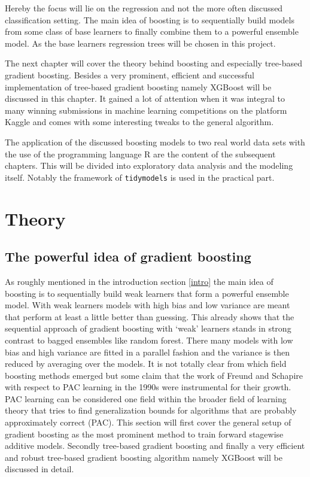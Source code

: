 \documentclass[
]{book}
\begin{document}
Hereby the focus will lie on the regression and not the more often discussed classification setting. The main idea of boosting is to sequentially build models from some class of base learners to finally combine them to a powerful ensemble model. As the base learners regression trees will be chosen in this project.

The next chapter will cover the theory behind boosting and especially tree-based gradient boosting. Besides a very prominent, efficient and successful implementation of tree-based gradient boosting namely XGBoost will be discussed in this chapter. It gained a lot of attention when it was integral to many winning submissions in machine learning competitions on the platform Kaggle and comes with some interesting tweaks to the general algorithm.

The application of the discussed boosting models to two real world data sets with the use of the programming language R are the content of the subsequent chapters. This will be divided into exploratory data analysis and the modeling itself. Notably the framework of \texttt{tidymodels} is used in the practical part.

\hypertarget{theory}{%
\chapter{Theory}\label{theory}}

\hypertarget{the-powerful-idea-of-gradient-boosting}{%
\section{The powerful idea of gradient boosting}\label{the-powerful-idea-of-gradient-boosting}}

As roughly mentioned in the introduction section \ref{intro} the main idea of boosting is to sequentially build weak learners that form a powerful ensemble model. With weak learners models with high bias and low variance are meant that perform at least a little better than guessing. This already shows that the sequential approach of gradient boosting with `weak' learners stands in strong contrast to bagged ensembles like random forest. There many models with low bias and high variance are fitted in a parallel fashion and the variance is then reduced by averaging over the models.\citep{HandsOnMLwithR} It is not totally clear from which field boosting methods emerged but some claim that the work of Freund and Schapire with respect to PAC learning in the 1990s were instrumental for their growth.\citep{elements} PAC learning can be considered one field within the broader field of learning theory that tries to find generalization bounds for algorithms that are probably approximately correct (PAC).\citep{pacbounds} This section will first cover the general setup of gradient boosting as the most prominent method to train forward stagewise additive models. Secondly tree-based gradient boosting and finally a very efficient and robust tree-based gradient boosting algorithm namely XGBoost will be discussed in detail.
\end{document}
